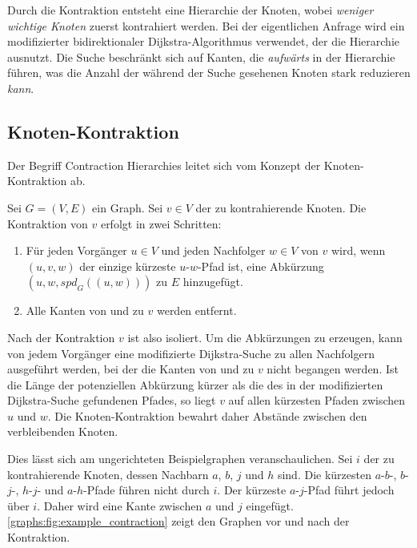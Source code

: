 Durch die Kontraktion entsteht eine Hierarchie der Knoten, wobei \emph{weniger wichtige Knoten} zuerst kontrahiert werden.
Bei der eigentlichen Anfrage wird ein modifizierter bidirektionaler Dijkstra-Algorithmus verwendet, der die Hierarchie ausnutzt.
Die Suche beschränkt sich auf Kanten, die \emph{aufwärts} in der Hierarchie führen, was die Anzahl der während der Suche gesehenen Knoten stark reduzieren \emph{kann}.

\subsection{Knoten-Kontraktion}

Der Begriff Contraction Hierarchies leitet sich vom Konzept der Knoten-Kontraktion ab.

\begin{definition}
  Sei $G = (V, E)$ ein Graph. Sei $v \in V$ der zu kontrahierende Knoten. Die Kontraktion von $v$ erfolgt in zwei Schritten:

  \begin{enumerate}
    \item\label{ch:contraction:when_shortcut}
    Für jeden Vorgänger $u \in V$ und jeden Nachfolger $w \in V$ von $v$ wird, wenn $(u, v, w)$ der einzige kürzeste $u$-$w$-Pfad ist, eine Abkürzung $(u, w, {spd}_G((u, w)))$ zu $E$ hinzugefügt.

    \item
          Alle Kanten von und zu $v$ werden entfernt.
  \end{enumerate}
\end{definition}

Nach der Kontraktion $v$ ist also isoliert.
Um die Abkürzungen zu erzeugen, kann von jedem Vorgänger eine modifizierte Dijkstra-Suche zu allen Nachfolgern ausgeführt werden, bei der die Kanten von und zu $v$ nicht begangen werden.
Ist die Länge der potenziellen Abkürzung kürzer als die des in der modifizierten Dijkstra-Suche gefundenen Pfades, so liegt $v$ auf allen kürzesten Pfaden zwischen $u$ und $w$.
Die Knoten-Kontraktion bewahrt daher Abstände zwischen den verbleibenden Knoten.

Dies lässt sich am ungerichteten Beispielgraphen veranschaulichen.
Sei $i$ der zu kontrahierende Knoten, dessen Nachbarn $a$, $b$, $j$ und $h$ sind.
Die kürzesten $a$-$b$-, $b$-$j$-, $h$-$j$- und $a$-$h$-Pfade führen nicht durch $i$.
Der kürzeste $a$-$j$-Pfad führt jedoch über $i$.
Daher wird eine Kante zwischen $a$ und $j$ eingefügt.
\autoref{graphs:fig:example_contraction} zeigt den Graphen vor und nach der Kontraktion.

